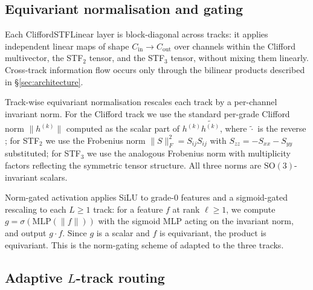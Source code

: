 \subsection{Equivariant normalisation and gating}\label{supp:normalization}

Each CliffordSTFLinear layer is block-diagonal across tracks: it applies independent linear maps of shape $C_{\mathrm{in}} \to C_{\mathrm{out}}$ over channels within the Clifford multivector, the STF$_2$ tensor, and the STF$_3$ tensor, without mixing them linearly. Cross-track information flow occurs only through the bilinear products described in \S\ref{sec:architecture}.

Track-wise equivariant normalisation rescales each track by a per-channel invariant norm. For the Clifford track we use the standard per-grade Clifford norm $\lVert h^{(k)}\rVert$ computed as the scalar part of $h^{(k)}\widetilde{h^{(k)}}$, where $\widetilde{\cdot}$ is the reverse \citep{doran2003geometric}; for STF$_2$ we use the Frobenius norm $\lVert S\rVert_F^2 = S_{ij}S_{ij}$ with $S_{zz} = -S_{xx}-S_{yy}$ substituted; for STF$_3$ we use the analogous Frobenius norm with multiplicity factors reflecting the symmetric tensor structure. All three norms are $\mathrm{SO}(3)$-invariant scalars.

Norm-gated activation applies SiLU to grade-0 features and a sigmoid-gated rescaling to each $L \geq 1$ track: for a feature $f$ at rank $\ell \geq 1$, we compute $g = \sigma(\mathrm{MLP}(\lVert f\rVert))$ with the sigmoid MLP acting on the invariant norm, and output $g \cdot f$. Since $g$ is a scalar and $f$ is equivariant, the product is equivariant. This is the norm-gating scheme of \citet{weiler20183d,schutt2021painn} adapted to the three tracks.

\subsection{Adaptive \texorpdfstring{$L$}{L}-track routing}\label{supp:routing}

